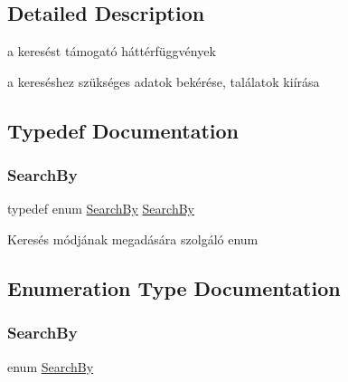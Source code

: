 \subsection{Detailed Description}
a keresést támogató háttérfüggvények

a kereséshez szükséges adatok bekérése, találatok kiírása 

\subsection{Typedef Documentation}
\mbox{\label{group__search_ga2ab4e565bcf990b57e010007e13bec43}} 
\subsubsection{\texorpdfstring{Search\+By}{SearchBy}}
{\footnotesize\ttfamily typedef enum \hyperlink{group__search_gaf9df49b17c9441844cafc15064ec50fc}{Search\+By} \hyperlink{group__search_gaf9df49b17c9441844cafc15064ec50fc}{Search\+By}}

Keresés módjának megadására szolgáló enum 

\subsection{Enumeration Type Documentation}
\mbox{\label{group__search_gaf9df49b17c9441844cafc15064ec50fc}} 
\subsubsection{\texorpdfstring{Search\+By}{SearchBy}}
{\footnotesize\ttfamily enum \hyperlink{group__search_gaf9df49b17c9441844cafc15064ec50fc}{Search\+By}}

